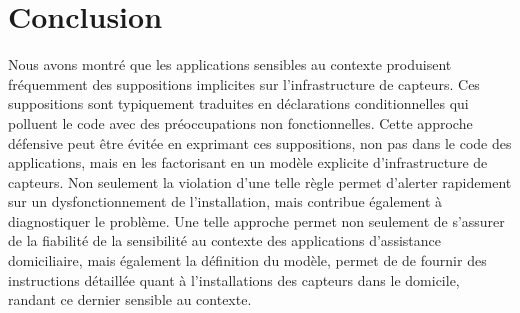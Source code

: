 \section{Conclusion}\label{sec:futurework}
Nous avons montré que les applications sensibles au contexte produisent fréquemment des suppositions implicites sur l'infrastructure de capteurs. Ces suppositions sont typiquement traduites en déclarations conditionnelles qui polluent le code avec des préoccupations non fonctionnelles. Cette approche défensive peut être évitée en exprimant ces suppositions, non pas dans le code des applications, mais en les factorisant en un modèle explicite d'infrastructure de capteurs. Non seulement la violation d'une telle règle permet d'alerter rapidement sur un dysfonctionnement de l'installation, mais contribue également à diagnostiquer le problème. Une telle approche permet non seulement de s'assurer de la fiabilité de la sensibilité au contexte des applications d'assistance domiciliaire, mais également la définition du modèle, permet de de fournir des instructions détaillée quant à l'installations des capteurs dans le domicile, randant ce dernier sensible au contexte.




